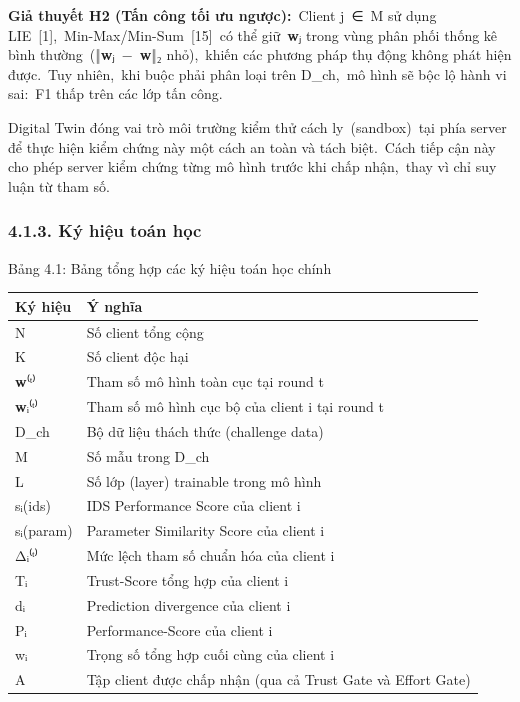 \textbf{Giả thuyết H2 (Tấn công tối ưu ngược):}~Client j~∈~M sử dụng LIE~{[}1{]},~Min-Max/Min-Sum~{[}15{]}~có thể giữ~\textbf{w}ⱼ trong vùng phân phối thống kê bình thường~(‖\textbf{w}ⱼ~−~\textbf{w}‖₂ nhỏ),~khiến các phương pháp thụ động không phát hiện được.~Tuy nhiên,~khi buộc phải phân loại trên D\_ch,~mô hình sẽ bộc lộ hành vi sai:~F1 thấp trên các lớp tấn công.

Digital Twin đóng vai trò môi trường kiểm thử cách ly~(sandbox)~tại phía server để thực hiện kiểm chứng này một cách an toàn và tách biệt.~Cách tiếp cận này cho phép server kiểm chứng từng mô hình trước khi chấp nhận,~thay vì chỉ suy luận từ tham số.

\subsubsection{4.1.3. Ký hiệu toán học}\label{kuxfd-hiux1ec7u-touxe1n-hux1ecdc}

\protect{}\label{_Toc228034265}{}Bảng 4.1: Bảng tổng hợp các ký hiệu toán học chính

{\def\LTcaptype{none} %
\begin{longtable}[]{@{}
  >{\raggedright\arraybackslash}p{}
  >{\raggedright\arraybackslash}p{}@{}}
\toprule\noalign{}
\begin{minipage}[b]{\linewidth}\centering
\textbf{Ký hiệu}
\end{minipage} & \begin{minipage}[b]{\linewidth}\centering
\textbf{Ý nghĩa}
\end{minipage} \\
\midrule\noalign{}
\endhead
\bottomrule\noalign{}
\endlastfoot
N & Số client tổng cộng \\
K & Số client độc hại \\
\textbf{w}⁽ᵗ⁾ & Tham số mô hình toàn cục tại round t \\
\textbf{w}ᵢ⁽ᵗ⁾ & Tham số mô hình cục bộ của client i tại round t \\
D\_ch & Bộ dữ liệu thách thức (challenge data) \\
M & Số mẫu trong D\_ch \\
L & Số lớp (layer) trainable trong mô hình \\
sᵢ(ids) & IDS Performance Score của client i \\
sᵢ(param) & Parameter Similarity Score của client i \\
Δᵢ⁽ᵗ⁾ & Mức lệch tham số chuẩn hóa của client i \\
Tᵢ & Trust-Score tổng hợp của client i \\
dᵢ & Prediction divergence của client i \\
Pᵢ & Performance-Score của client i \\
wᵢ & Trọng số tổng hợp cuối cùng của client i \\
A & Tập client được chấp nhận (qua cả Trust Gate và Effort Gate) \\
\end{longtable}
}

